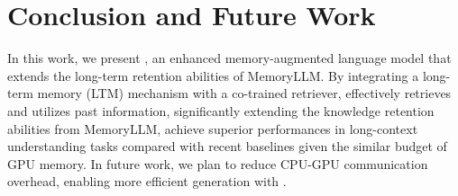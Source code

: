 \vspace{-5pt}
\section{Conclusion and Future Work}
In this work, we present \ours, an enhanced memory-augmented language model that extends the long-term retention abilities of MemoryLLM. By integrating a long-term memory (LTM) mechanism with a co-trained retriever, \ours effectively retrieves and utilizes past information, significantly extending the knowledge retention abilities from MemoryLLM, achieve superior performances in long-context understanding tasks compared with recent baselines given the similar budget of GPU memory. 
In future work, we plan to reduce CPU-GPU communication overhead, enabling more efficient generation with \ours.
